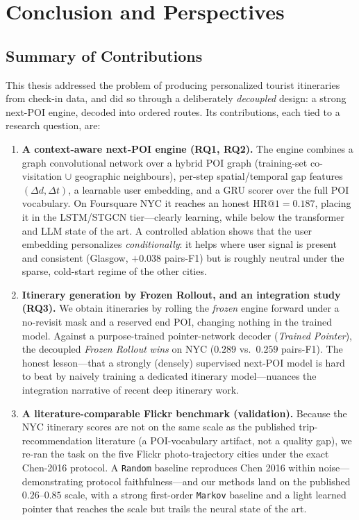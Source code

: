 \chapter{Conclusion and Perspectives}
\label{ch:conclusion}

\section{Summary of Contributions}
\label{sec:conc-summary}

This thesis addressed the problem of producing personalized tourist itineraries from check-in
data, and did so through a deliberately \emph{decoupled} design: a strong next-POI engine,
decoded into ordered routes. Its contributions, each tied to a research question, are:

\begin{enumerate}
  \item \textbf{A context-aware next-POI engine (RQ1, RQ2).} The engine combines a graph
  convolutional network over a hybrid POI graph (training-set co-visitation $\cup$ geographic
  neighbours), per-step spatial/temporal gap features $(\Delta d,\Delta t)$, a learnable user
  embedding, and a GRU scorer over the full POI vocabulary. On Foursquare NYC it reaches an
  honest $\mathrm{HR@}1=0.187$, placing it in the LSTM/STGCN tier---clearly learning, while
  below the transformer and LLM state of the art. A controlled ablation shows that the user
  embedding personalizes \emph{conditionally}: it helps where user signal is present and
  consistent (Glasgow, $+0.038$ pairs-F1) but is roughly neutral under the sparse,
  cold-start regime of the other cities.

  \item \textbf{Itinerary generation by Frozen Rollout, and an integration study (RQ3).} We
  obtain itineraries by rolling the \emph{frozen} engine forward under a no-revisit mask and a
  reserved end POI, changing nothing in the trained model. Against a purpose-trained
  pointer-network decoder (\emph{Trained Pointer}), the decoupled \emph{Frozen Rollout}
  \emph{wins} on NYC ($0.289$ vs.\ $0.259$ pairs-F1). The honest lesson---that a strongly
  (densely) supervised next-POI model is hard to beat by naively training a dedicated itinerary
  model---nuances the integration narrative of recent deep itinerary work.

  \item \textbf{A literature-comparable Flickr benchmark (validation).} Because the NYC
  itinerary scores are not on the same scale as the published trip-recommendation literature
  (a POI-vocabulary artifact, not a quality gap), we re-ran the task on the five Flickr
  photo-trajectory cities under the exact Chen-2016 protocol. A \texttt{Random} baseline
  reproduces Chen 2016 within noise---demonstrating protocol faithfulness---and our methods land
  on the published $0.26$--$0.85$ scale, with a strong first-order \texttt{Markov} baseline and a
  light learned pointer that reaches the scale but trails the neural state of the art.
\end{enumerate}


